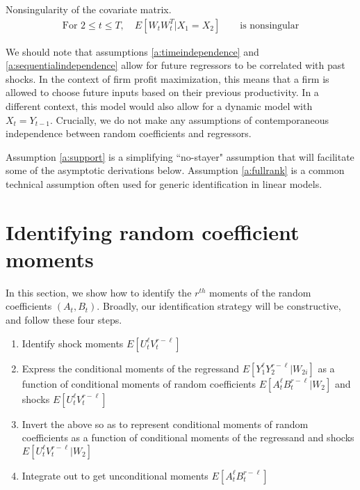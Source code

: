 \begin{assumption}{}  \label{a:fullrank}
  Nonsingularity of the covariate matrix.
  \begin{align}
    \text{For }2 \leq t \leq T ,
    \quad     
    E[W_tW_t^{T} | X_1 = X_2] \qquad \text{is nonsingular}
  \end{align}
\end{assumption}


We should note that assumptions \ref{a:timeindependence} and \ref{a:sequentialindependence} allow for future regressors to be correlated with past shocks. In the context of firm profit maximization, this means that a firm is allowed to choose future inputs based on their previous productivity. In a different context, this model would also allow for a dynamic model with $X_t = Y_{t-1}$. Crucially, we do not make any assumptions of contemporaneous independence between random coefficients and regressors.

Assumption \ref{a:support} is a simplifying ``no-stayer" assumption that will facilitate some of the asymptotic derivations below. Assumption \ref{a:fullrank} is a common technical assumption often used for generic identification in linear models.

\section{Identifying random coefficient moments}

In this section, we show how to identify the $r^{th}$ moments of the random coefficients $(A_{t}, B_{t})$. Broadly, our identification strategy will be constructive, and follow these four steps.

\begin{enumerate}
  \item Identify shock moments $E[U_{t}^{\ell}V_{t}^{r-\ell}]$ 
  
  \item Express the conditional moments of the regressand $E[Y_{1}^\ell Y_{2}^{r - \ell} | W_{2i}]$ as a function of conditional moments of random coefficients $E[A_{t}^{\ell}B_{t}^{r-\ell}|W_{2}]$ and shocks $E[U_{t}^{\ell}V_{t}^{r-\ell}]$ 
  
  \item Invert the above so as to represent conditional moments of random coefficients as a function of conditional moments of the regressand and shocks $E[U_{t}^{\ell}V_{t}^{r-\ell}|W_{2}]$ 
  
  \item Integrate out to get unconditional moments $E[A_{t}^{\ell}B_{t}^{r-\ell}]$
\end{enumerate}




